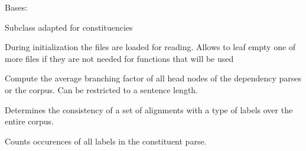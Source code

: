 \documentclass[letterpaper,10pt,english]{sphinxmanual}
\begin{document}
\begin{fulllineitems}
\label{file_processing:file_processing.ProcessConstituencies}
Bases: {\hyperref[file_processing:file_processing.ProcessFiles]{}}

Subclass adapted for constituencies

During initialization the files are loaded for reading. Allows to leaf empty
one of more files if they are not needed for functions that will be used

\begin{fulllineitems}
\label{file_processing:file_processing.ProcessConstituencies.all_rules}
\end{fulllineitems}


\begin{fulllineitems}
\label{file_processing:file_processing.ProcessConstituencies.branching_factor}
Compute the average branching factor of all head nodes
of the dependency parses or the corpus.
Can be restricted to a sentence length.

\end{fulllineitems}


\begin{fulllineitems}
\label{file_processing:file_processing.ProcessConstituencies.consistent_labels}
Determines the consistency of a set of alignments with a type of labels
over the entire corpus.

\end{fulllineitems}


\begin{fulllineitems}
\label{file_processing:file_processing.ProcessConstituencies.relation_count}
Counts occurences of all labels in the
constituent parse.


\end{fulllineitems}
\end{fulllineitems}
\end{document}
